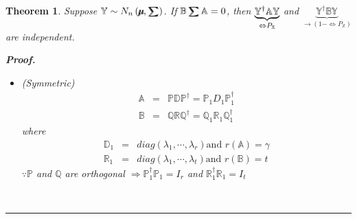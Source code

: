 \documentclass{article}
\newtheorem{theorem}{Theorem}
\newenvironment{proof}[1][Proof]{\noindent\textbf{#1.} }{\ \rule{0.5em}{0.5em}}
\begin{document}
\begin{theorem}
Suppose $\mathbb{Y}\sim N_{n}\left( \mathbb{%
\mu\mkern-12.3mu\mu%
},%
\tsum\mkern-20mu\tsum%
\right) $. If $\mathbb{B}%
\tsum\mkern-20mu\tsum%
\mathbb{A}=0$, then $\underset{\Leftrightarrow P_{\mathbb{X}}}{\underbrace{%
\mathbb{Y}^{\dagger }\mathbb{AY}}}$ and $\underset{\rightarrow \left(
1-\Leftrightarrow P_{\mathbb{X}}\right) }{\underbrace{\mathbb{Y}^{\dagger }%
\mathbb{BY}}}$ are independent.

\begin{proof}

\begin{itemize}
\item[Case 1] (Symmetric)%
\begin{eqnarray*}
\mathbb{A} &=&\mathbb{PDP}^{\dagger }=\mathbb{P}_{1}D_{1}\mathbb{P}%
_{1}^{\dagger } \\
\mathbb{B} &=&\mathbb{QRQ}^{\dagger }=\mathbb{Q}_{1}\mathbb{R}_{1}\mathbb{Q}%
_{1}^{\dagger }
\end{eqnarray*}%
where%
\begin{eqnarray*}
\mathbb{D}_{1} &=&diag\left( \lambda _{1},\cdots ,\lambda _{r}\right) \text{
and }r\left( \mathbb{A}\right) =\gamma  \\
\mathbb{R}_{1} &=&diag\left( \lambda _{1},\cdots ,\lambda _{t}\right) \text{
and }r\left( \mathbb{B}\right) =t
\end{eqnarray*}%
$\because \mathbb{P}$ and $\mathbb{Q}$ are orthogonal\newline
\newline
$\Rightarrow \mathbb{P}_{1}^{\dagger }\mathbb{P}_{1}=I_{r}$ and $\mathbb{R}%
_{1}^{\dagger }\mathbb{R}_{1}=I_{t}$
\end{itemize}
\end{proof}
\end{theorem}
\end{document}
